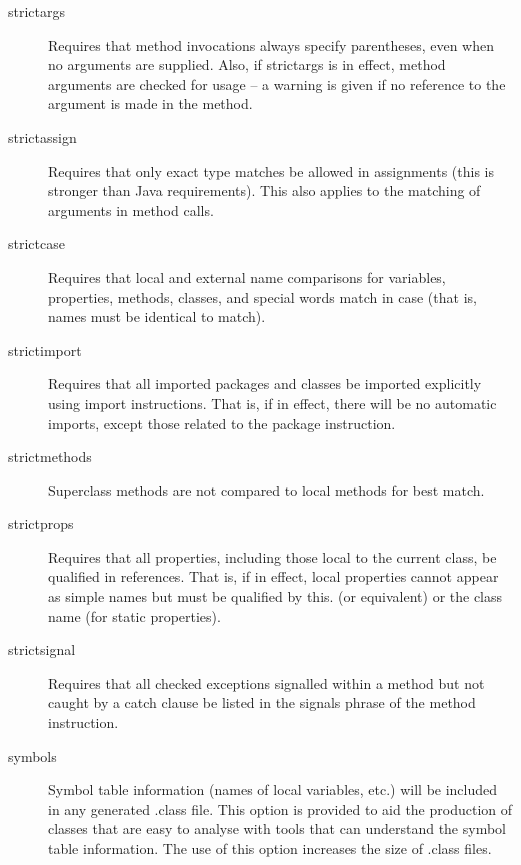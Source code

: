 \begin{description}
\item[strictargs]
Requires that method invocations always specify parentheses, even when no arguments are supplied. Also, if strictargs is in effect, method arguments are checked for usage – a warning is given if no reference to the argument is made in the method.
\item[strictassign]
Requires that only exact type matches be allowed in assignments (this is stronger than Java requirements). This also applies to the matching of arguments in method calls.
\item[strictcase]
Requires that local and external name comparisons for variables, properties, methods, classes, and special words match in case (that is, names must be identical to match).
\item[strictimport]
Requires that all imported packages and classes be imported explicitly using import instructions. That is, if in effect, there will be no automatic imports, except those related to the package instruction.
\item[strictmethods]
Superclass methods are not compared to local methods for best match.
\item[strictprops]
Requires that all properties, including those local to the current class, be qualified in references. That is, if in effect, local properties cannot appear as simple names but must be qualified by this. (or equivalent) or the class name (for static properties).
\item[strictsignal]
Requires that all checked exceptions signalled within a method but not caught by a catch clause be listed in the signals phrase of the method instruction.
\item[symbols]
Symbol table information (names of local variables, etc.) will be included in any generated .class file. This option is provided to aid the production of classes that are easy to analyse with tools that can understand the symbol table information. The use of this option increases the size of .class files.

\end{description}
